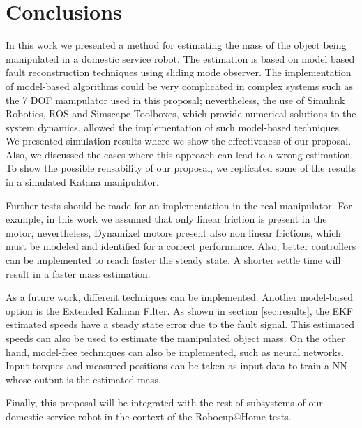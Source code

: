 \documentclass[a4paper, 10pt]{article}
\begin{document}
\section{Conclusions}
\label{sec:conclusions}
In this work we presented a method for estimating the mass of the object being manipulated in a domestic service robot. The estimation is based on model based fault reconstruction techniques using sliding mode observer. The implementation of model-based algorithms could be very complicated in complex systems such as the 7 DOF manipulator used in this proposal; nevertheless, the use of Simulink Robotics, ROS and Simscape Toolboxes, which provide numerical solutions to the system dynamics, allowed the implementation of such model-based techniques. We presented simulation results where we show the effectiveness of our proposal. Also, we discussed the cases where this approach can lead to a wrong estimation. To show the possible reusability of our proposal, we replicated some of the results in a simulated Katana manipulator. 

Further tests should be made for an implementation in the real manipulator. For example, in this work we assumed that only linear friction is present in the motor, nevertheless, Dynamixel motors present also non linear frictions, which must be modeled and identified for a correct performance. Also, better controllers can be implemented to reach faster the steady state. A shorter settle time will result in a faster mass estimation. 

As a future work, different techniques can be implemented. Another model-based option is the Extended Kalman Filter. As shown in section \ref{sec:results}, the EKF estimated speeds have a steady state error due to the fault signal. This estimated speeds can also be used to estimate the manipulated object mass. On the other hand, model-free techniques can also be implemented, such as neural networks. Input torques and measured positions can be taken as input data to train a NN whose output is the estimated mass.

Finally, this proposal will be integrated with the rest of subsystems of our domestic service robot in the context of the Robocup@Home tests. 




\end{document}
